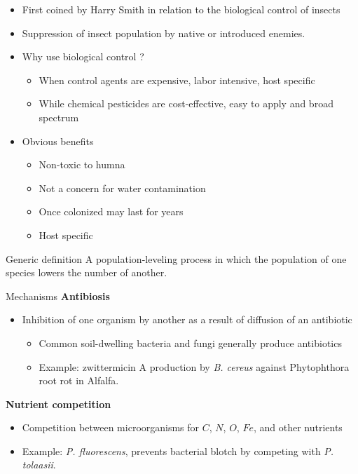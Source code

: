 \documentclass[11pt,dvipsnames,ignorenonframetext,aspectratio=169]{beamer}
\providecommand{\tightlist}{%
  \setlength{\itemsep}{0pt}\setlength{\parskip}{0pt}}
\begin{document}
\begin{frame}{}
\protect\hypertarget{section-12}{}
\small

\begin{itemize}
\tightlist
\item
  First coined by Harry Smith in relation to the biological control of
  insects
\item
  Suppression of insect population by native or introduced enemies.
\item
  Why use biological control ?

  \begin{itemize}
  \tightlist
  \item
    When control agents are expensive, labor intensive, host specific
  \item
    While chemical pesticides are cost-effective, easy to apply and
    broad spectrum
  \end{itemize}
\item
  Obvious benefits

  \begin{itemize}
  \tightlist
  \item
    Non-toxic to humna
  \item
    Not a concern for water contamination
  \item
    Once colonized may last for years
  \item
    Host specific
  \end{itemize}
\end{itemize}

\begin{block}{Generic definition}
\protect\hypertarget{generic-definition}{}
A population-leveling process in which the population of one species
lowers the number of another.
\end{block}
\end{frame}

\begin{frame}{Mechanisms}
\protect\hypertarget{mechanisms}{}
\textbf{Antibiosis}

\begin{itemize}
\tightlist
\item
  Inhibition of one organism by another as a result of diffusion of an
  antibiotic

  \begin{itemize}
  \small
  \item Common soil-dwelling bacteria and fungi generally produce antibiotics
  \item Example: zwittermicin A production by \textit{B. cereus} against Phytophthora root rot in Alfalfa.
  \end{itemize}
\end{itemize}

\textbf{Nutrient competition}

\begin{itemize}
\tightlist
\item
  Competition between microorganisms for \(C\), \(N\), \(O\), \(Fe\),
  and other nutrients
\item
  Example: \emph{P. fluorescens}, prevents bacterial blotch by competing
  with \emph{P. tolaasii}.
\end{itemize}
\end{frame}
\end{document}
